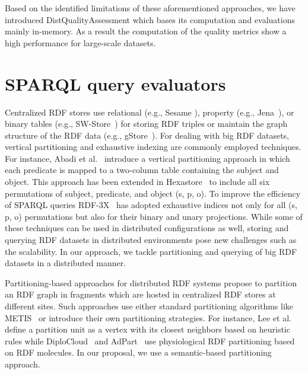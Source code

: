 Based on the identified limitations of these aforementioned approaches, we have introduced DistQualityAssessment which bases its computation and evaluations mainly in-memory.
As a result the computation of the quality metrics show a high performance for large-scale datasets.

\section{SPARQL query evaluators}

Centralized \gls{RDF} stores use relational (e.g., Sesame \cite{BroekstraKH02}), property (e.g., Jena~\cite{Wilkinson06}), or binary tables (e.g., SW-Store~\cite{AbadiMMH09}) for storing \gls{RDF} triples or maintain the graph structure of the \gls{RDF} data (e.g., gStore~\cite{ZouMCOZ11}). 
For dealing with big \gls{RDF} datasets, vertical partitioning and exhaustive indexing are commonly employed techniques. 
For instance, Abadi et al.~\cite{AbadiMMH07} introduce a vertical partitioning approach in which each predicate is mapped to a two-column table containing the subject and object. 
This approach has been extended in Hexastore~\cite{WeissKB08} to include all six permutations of subject, predicate, and object (s, p, o). 
To improve the efficiency of \gls{SPARQL} queries RDF-3X~\cite{NeumannW10} has adopted exhaustive indices not only for all (s, p, o) permutations but also for their binary and unary projections. 
While some of these techniques can be used in distributed configurations as well, storing and querying \gls{RDF} datasets in distributed environments pose new challenges such as the scalability. 
In our approach, we tackle partitioning and querying of big \gls{RDF} datasets in a distributed manner.

Partitioning-based approaches for distributed \gls{RDF} systems propose to partition an \gls{RDF} graph in fragments which are hosted in centralized \gls{RDF} stores at different sites. 
Such approaches use either standard partitioning algorithms like METIS~\cite{GurajadaSMT14} or introduce their own partitioning strategies. 
For instance, Lee et al.~\cite{LeeL2013} define a partition unit as a vertex with its closest neighbors based on heuristic rules while DiploCloud~\cite{WylotC16} and AdPart~\cite{harbi2016accelerating} use physiological \gls{RDF} partitioning based on \gls{RDF} molecules. 
In our proposal, we use a semantic-based partitioning approach.

